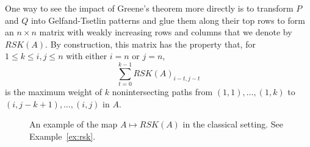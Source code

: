 \documentclass[ALCO,Unicode,published]{cedram}
\numberwithin{equation}{section}
\begin{document}
One way to see the impact of Greene's theorem more directly is to transform $P$ and $Q$ into Gelfand-Tsetlin patterns and glue them along their top rows to form an $n \times n$ matrix with weakly increasing rows and columns that we denote by $RSK(A)$. By construction, this matrix has the property that, for $1 \leq k \leq i,j \leq n$ with either $i=n$ or $j=n$, 
\[\sum_{t=0}^{k-1} RSK(A)_{i-t,j-t}\] is the maximum weight of $k$ nonintersecting paths from $(1,1), \dots, (1,k)$ to $(i,j-k+1), \dots, (i,j)$ in $A$.


\begin{figure}
    \centering
    \caption{An example of the map $A \mapsto RSK(A)$ in the classical setting. See Example~\ref{ex:rsk}.}
    \label{fig:rsk}
\end{figure}
\end{document}
